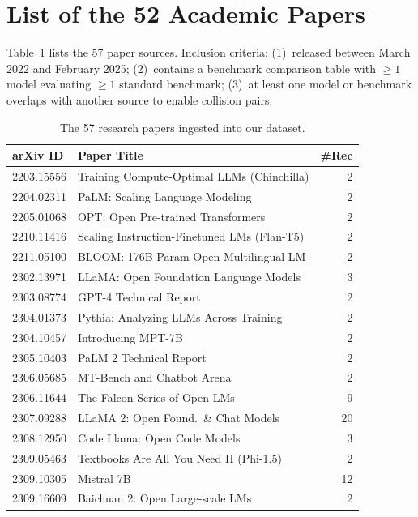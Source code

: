 \documentclass[11pt]{article}
\begin{document}
\clearpage
\section{List of the 52 Academic Papers}
\label{app:papers}

Table~\ref{tab:papers} lists the 57 paper sources.
Inclusion criteria: (1)~released between March 2022 and February 2025;
(2)~contains a benchmark comparison table with $\geq 1$ model evaluating
$\geq 1$ standard benchmark; (3)~at least one model or benchmark overlaps
with another source to enable collision pairs.

\begin{table}[t!]
\centering
\tiny
\setlength{\tabcolsep}{2pt}
\caption{The 57 research papers ingested into our dataset.}
\label{tab:papers}
\begin{tabular}{llr}
\toprule
\textbf{arXiv ID} & \textbf{Paper Title} & \textbf{\#Rec} \\
\midrule
2203.15556 & Training Compute-Optimal LLMs (Chinchilla) & 2 \\
2204.02311 & PaLM: Scaling Language Modeling & 2 \\
2205.01068 & OPT: Open Pre-trained Transformers & 2 \\
2210.11416 & Scaling Instruction-Finetuned LMs (Flan-T5) & 2 \\
2211.05100 & BLOOM: 176B-Param Open Multilingual LM & 2 \\
2302.13971 & LLaMA: Open Foundation Language Models & 3 \\
2303.08774 & GPT-4 Technical Report & 2 \\
2304.01373 & Pythia: Analyzing LLMs Across Training & 2 \\
2304.10457 & Introducing MPT-7B & 2 \\
2305.10403 & PaLM 2 Technical Report & 2 \\
2306.05685 & MT-Bench and Chatbot Arena & 2 \\
2306.11644 & The Falcon Series of Open LMs & 9 \\
2307.09288 & LLaMA 2: Open Found.\ \& Chat Models & 20 \\
2308.12950 & Code Llama: Open Code Models & 3 \\
2309.05463 & Textbooks Are All You Need II (Phi-1.5) & 2 \\
2309.10305 & Mistral 7B & 12 \\
2309.16609 & Baichuan 2: Open Large-scale LMs & 2 \\

\end{tabular}
\end{table}
\end{document}
